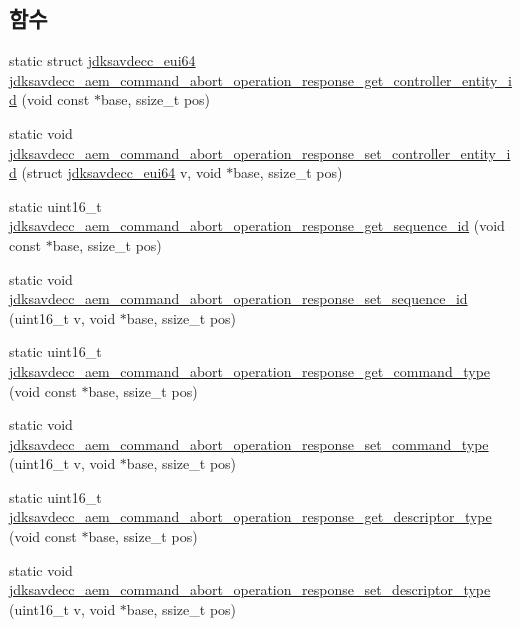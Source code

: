 \subsection*{함수}
\begin{DoxyCompactItemize}
\item 
static struct \hyperlink{structjdksavdecc__eui64}{jdksavdecc\+\_\+eui64} \hyperlink{group__command__abort__operation__response_ga858ac1ba856c63dfc52fb67af588eb07}{jdksavdecc\+\_\+aem\+\_\+command\+\_\+abort\+\_\+operation\+\_\+response\+\_\+get\+\_\+controller\+\_\+entity\+\_\+id} (void const $\ast$base, ssize\+\_\+t pos)
\item 
static void \hyperlink{group__command__abort__operation__response_ga7916eb80714064439ae9649755b1fb9f}{jdksavdecc\+\_\+aem\+\_\+command\+\_\+abort\+\_\+operation\+\_\+response\+\_\+set\+\_\+controller\+\_\+entity\+\_\+id} (struct \hyperlink{structjdksavdecc__eui64}{jdksavdecc\+\_\+eui64} v, void $\ast$base, ssize\+\_\+t pos)
\item 
static uint16\+\_\+t \hyperlink{group__command__abort__operation__response_ga4f024e99c55a6df01d67c9ea5fe31491}{jdksavdecc\+\_\+aem\+\_\+command\+\_\+abort\+\_\+operation\+\_\+response\+\_\+get\+\_\+sequence\+\_\+id} (void const $\ast$base, ssize\+\_\+t pos)
\item 
static void \hyperlink{group__command__abort__operation__response_ga52b275fab88128227972cbcfee3069d5}{jdksavdecc\+\_\+aem\+\_\+command\+\_\+abort\+\_\+operation\+\_\+response\+\_\+set\+\_\+sequence\+\_\+id} (uint16\+\_\+t v, void $\ast$base, ssize\+\_\+t pos)
\item 
static uint16\+\_\+t \hyperlink{group__command__abort__operation__response_ga6e8c6d5184b0f9272c54c73852151745}{jdksavdecc\+\_\+aem\+\_\+command\+\_\+abort\+\_\+operation\+\_\+response\+\_\+get\+\_\+command\+\_\+type} (void const $\ast$base, ssize\+\_\+t pos)
\item 
static void \hyperlink{group__command__abort__operation__response_gad7bc4fb4afa15ee73c8bb3b1817a648a}{jdksavdecc\+\_\+aem\+\_\+command\+\_\+abort\+\_\+operation\+\_\+response\+\_\+set\+\_\+command\+\_\+type} (uint16\+\_\+t v, void $\ast$base, ssize\+\_\+t pos)
\item 
static uint16\+\_\+t \hyperlink{group__command__abort__operation__response_ga3ac116931a830b6e75635f3d0c3891aa}{jdksavdecc\+\_\+aem\+\_\+command\+\_\+abort\+\_\+operation\+\_\+response\+\_\+get\+\_\+descriptor\+\_\+type} (void const $\ast$base, ssize\+\_\+t pos)
\item 
static void \hyperlink{group__command__abort__operation__response_ga20e3e13b6dd93c2d0ebfe7d35ba8eda8}{jdksavdecc\+\_\+aem\+\_\+command\+\_\+abort\+\_\+operation\+\_\+response\+\_\+set\+\_\+descriptor\+\_\+type} (uint16\+\_\+t v, void $\ast$base, ssize\+\_\+t pos)

\end{DoxyCompactItemize}
